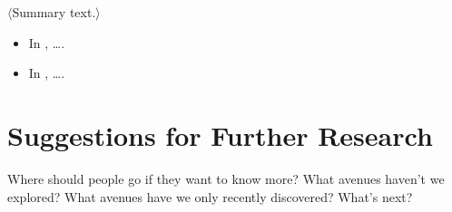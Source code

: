 \label{conclusion:conclusion}
$\langle$Summary text.$\rangle$

\begin{itemize}
\item
In , \dots.

\item
In , \dots.

\end{itemize}

\section{Suggestions for Further Research}
Where should people go if they want to know more? What avenues haven't we explored? What avenues have we only recently discovered? What's next?